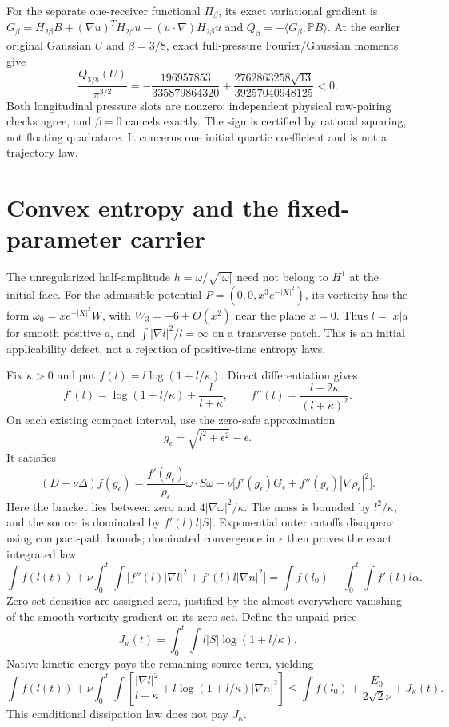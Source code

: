 \documentclass[11pt]{article}
\begin{document}
For the separate one-receiver functional $\Pi_\beta$, its exact
variational gradient is
$G_\beta=H_{2\beta}B+(\nabla u)^TH_{2\beta}u
 -(u\cdot\nabla)H_{2\beta}u$ and $Q_\beta=-\langle G_\beta,\mathbb PB\rangle$.
At the earlier original Gaussian $U$ and $\beta=3/8$, exact full-pressure
Fourier/Gaussian moments give
\[
 \frac{Q_{3/8}(U)}{\pi^{3/2}}
 =-\frac{196957853}{335879864320}
 +\frac{2762863258\sqrt{13}}{39257040948125}<0.
\]
Both longitudinal pressure slots are nonzero; independent physical
raw-pairing checks agree, and $\beta=0$ cancels exactly.
The sign is certified by rational squaring, not floating quadrature.
It concerns one initial quartic coefficient and is not a trajectory law.

\section{Convex entropy and the fixed-parameter carrier}
The unregularized half-amplitude $h=\omega/\sqrt{|\omega|}$ need not
belong to $H^1$ at the initial face. For the admissible potential
$P=(0,0,x^3e^{-|X|^2})$, its vorticity has the form
$\omega_0=xe^{-|X|^2}W$, with $W_3=-6+O(x^2)$ near the plane $x=0$.
Thus $l=|x|a$ for smooth positive $a$, and
$\int |\nabla l|^2/l=\infty$ on a transverse patch. This is an initial
applicability defect, not a rejection of positive-time entropy laws.

Fix $\kappa>0$ and put $f(l)=l\log(1+l/\kappa)$. Direct differentiation gives
\[
 f'(l)=\log(1+l/\kappa)+\frac l{l+\kappa},\qquad
 f''(l)=\frac{l+2\kappa}{(l+\kappa)^2}.
\]
On each existing compact interval, use the zero-safe approximation
\[
 g_\epsilon=\sqrt{l^2+\epsilon^2}-\epsilon.
\]
It satisfies
\[
 (D-\nu\Delta)f(g_\epsilon)
 =\frac{f'(g_\epsilon)}{\rho_\epsilon}\omega\cdot S\omega
 -\nu\bigl[f'(g_\epsilon)G_\epsilon
                  +f''(g_\epsilon)|\nabla\rho_\epsilon|^2\bigr].
\]
Here the bracket lies between zero and $4|\nabla\omega|^2/\kappa$.
The mass is bounded by $l^2/\kappa$, and the source is dominated by
$f'(l)l|S|$. Exponential outer cutoffs disappear using compact-path bounds;
dominated convergence in $\epsilon$ then proves the exact integrated law
\[
 \int f(l(t))+\nu\int_0^t\!\int
 \bigl[f''(l)|\nabla l|^2+f'(l)l|\nabla n|^2\bigr]
 =\int f(l_0)+\int_0^t\!\int f'(l)l\alpha .
\]
Zero-set densities are assigned zero, justified by the almost-everywhere
vanishing of the smooth vorticity gradient on its zero set. Define the unpaid price
\[
 J_\kappa(t)=\int_0^t\!\int l|S|\log(1+l/\kappa).
\]
Native kinetic energy pays the remaining source term, yielding
\[
 \int f(l(t))+\nu\int_0^t\!\int
 \left[\frac{|\nabla l|^2}{l+\kappa}
          +l\log(1+l/\kappa)|\nabla n|^2\right]
 \le\int f(l_0)+\frac{E_0}{2\sqrt2\nu}+J_\kappa(t).
\]
This conditional dissipation law does not pay $J_\kappa$.
\end{document}
